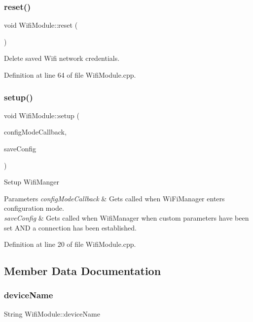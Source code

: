 \subsubsection{\texorpdfstring{reset()}{reset()}}
{\footnotesize\ttfamily void Wifi\+Module\+::reset (\begin{DoxyParamCaption}{ }\end{DoxyParamCaption})}

Delete saved Wifi network credentials. 

Definition at line 64 of file Wifi\+Module.\+cpp.

\mbox{\label{class_wifi_module_a78a8fa5090dc159e070d32c957e661dd}} 
\subsubsection{\texorpdfstring{setup()}{setup()}}
{\footnotesize\ttfamily void Wifi\+Module\+::setup (\begin{DoxyParamCaption}\item[{void($\ast$)(Wi\+Fi\+Manager $\ast$my\+Wi\+Fi\+Manager)}]{config\+Mode\+Callback,  }\item[{void($\ast$)(void)}]{save\+Config }\end{DoxyParamCaption})}

Setup Wifi\+Manger 
\begin{DoxyParams}{Parameters}
{\em config\+Mode\+Callback} & Gets called when Wi\+Fi\+Manager enters configuration mode. \\
\hline
{\em save\+Config} & Gets called when Wifi\+Manager when custom parameters have been set A\+ND a connection has been established. \\
\hline
\end{DoxyParams}


Definition at line 20 of file Wifi\+Module.\+cpp.



\subsection{Member Data Documentation}
\mbox{\label{class_wifi_module_a5887fc96e71a65413c0e8645c8947e17}} 
\subsubsection{\texorpdfstring{deviceName}{deviceName}}
{\footnotesize\ttfamily String Wifi\+Module\+::device\+Name\hspace{0.3cm}{\ttfamily [private]}}



